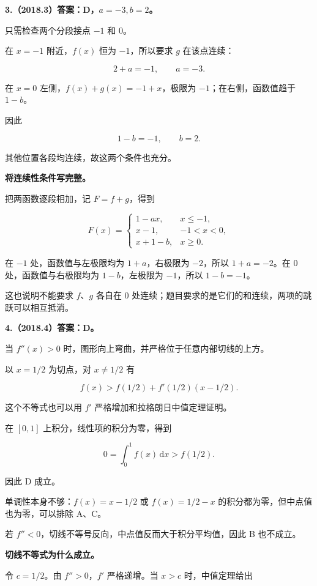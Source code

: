 \documentclass[UTF8,11pt,fontset=windows]{ctexart}
\begin{document}
\textbf{3.（2018.3）答案：D，$a=-3,b=2$。}

只需检查两个分段接点 $-1$ 和 $0$。

在 $x=-1$ 附近，$f(x)$ 恒为 $-1$，所以要求 $g$ 在该点连续：

$$
2+a=-1,
\qquad a=-3.
$$

在 $x=0$ 左侧，$f(x)+g(x)=-1+x$，极限为 $-1$；在右侧，函数值趋于 $1-b$。

因此

$$
1-b=-1,
\qquad b=2.
$$

其他位置各段均连续，故这两个条件也充分。

\textbf{将连续性条件写完整。}

把两函数逐段相加，记 $F=f+g$，得到

$$
F(x)=
\begin{cases}
1-ax,&x\le-1,\\
x-1,&-1<x<0,\\
x+1-b,&x\ge0.
\end{cases}
$$

在 $-1$ 处，函数值与左极限均为 $1+a$，右极限为 $-2$，所以 $1+a=-2$。在 $0$ 处，函数值与右极限均为 $1-b$，左极限为 $-1$，所以 $1-b=-1$。

这也说明不能要求 $f$、$g$ 各自在 $0$ 处连续；题目要求的是它们的和连续，两项的跳跃可以相互抵消。

\clearpage

\textbf{4.（2018.4）答案：D。}

当 $f''(x)>0$ 时，图形向上弯曲，并严格位于任意内部切线的上方。

以 $x=1/2$ 为切点，对 $x\ne1/2$ 有

$$
f(x)>f(1/2)+f'(1/2)(x-1/2).
$$

这个不等式也可以用 $f'$ 严格增加和拉格朗日中值定理证明。

在 $[0,1]$ 上积分，线性项的积分为零，得到

$$
0=\int_0^1f(x)\,\mathrm dx>f(1/2).
$$

因此 D 成立。

单调性本身不够：$f(x)=x-1/2$ 或 $f(x)=1/2-x$ 的积分都为零，但中点值也为零，可以排除 A、C。

若 $f''<0$，切线不等号反向，中点值反而大于积分平均值，因此 B 也不成立。

\textbf{切线不等式为什么成立。}

令 $c=1/2$。由 $f''>0$，$f'$ 严格递增。当 $x>c$ 时，中值定理给出
\end{document}

